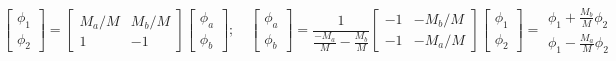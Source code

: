 \documentclass[twoside,10pt]{amsart}
\begin{document}
\[
\left[ 
\begin{matrix} 
\phi_1 \\ \phi_2 \end{matrix} \right] = \left[ \begin{matrix} M_a/M & M_b/M \\ 1 & -1 \end{matrix} \right] \left[ \begin{matrix} \phi_a \\ \phi_b \end{matrix} \right] ; \quad \left[ \begin{matrix} \phi_a \\ \phi_b \end{matrix} \right]  = \frac{1}{ \frac{ -M_a}{M} - \frac{M_b}{M} } \left[ \begin{matrix} -1 & - M_b/M \\ -1 & -M_a/M \end{matrix} \right] \left[ \begin{matrix} \phi_1 \\ \phi_2 \end{matrix} \right] = \begin{matrix} \phi_1 + \frac{M_b}{M} \phi_2 \\ \phi_1 - \frac{M_a}{M} \phi_2 \end{matrix}
\]
\end{document}
